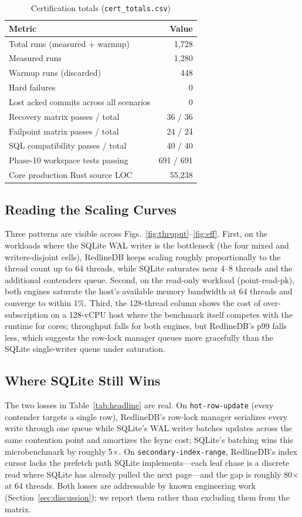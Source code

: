 \begin{table}[t]
\centering
\caption{Certification totals (\texttt{cert\_totals.csv})}
\label{tab:cert}
\renewcommand{\arraystretch}{1.05}
\begin{tabular}{@{}lr@{}}
\toprule
\textbf{Metric} & \textbf{Value} \\
\midrule
Total runs (measured + warmup) & 1{,}728 \\
Measured runs & 1{,}280 \\
Warmup runs (discarded) & 448 \\
Hard failures & 0 \\
Lost acked commits across all scenarios & 0 \\
Recovery matrix passes / total & 36 / 36 \\
Failpoint matrix passes / total & 24 / 24 \\
SQL compatibility passes / total & 40 / 40 \\
Phase-10 workspace tests passing & 691 / 691 \\
Core production Rust source LOC & 55{,}238 \\
\bottomrule
\end{tabular}
\end{table}

\subsection{Reading the Scaling Curves}
Three patterns are visible across Figs.~\ref{fig:thruput}--\ref{fig:eff}.
First, on the workloads where the SQLite WAL writer is the
bottleneck (the four mixed and writers-disjoint cells), RedlineDB
keeps scaling roughly proportionally to the thread count up to 64
threads, while SQLite saturates near 4--8 threads and the additional
contenders queue. Second, on the read-only workload (point-read-pk),
both engines saturate the host's available memory bandwidth at 64
threads and converge to within 1\%. Third, the 128-thread column
shows the cost of over-subscription on a 128-vCPU host where the
benchmark itself competes with the runtime for cores; throughput
falls for both engines, but RedlineDB's p99 falls less, which
suggests the row-lock manager queues more gracefully than the
SQLite single-writer queue under saturation.

\subsection{Where SQLite Still Wins}
The two losses in Table~\ref{tab:headline} are real. On
\texttt{hot-row-update} (every contender targets a single row),
RedlineDB's row-lock manager serializes every write through one
queue while SQLite's WAL writer batches updates across the same
contention point and amortizes the fsync cost; SQLite's batching wins
this microbenchmark by roughly 5$\times$.
On \texttt{secondary-index-range}, RedlineDB's index cursor lacks
the prefetch path SQLite implements---each leaf chase is a discrete
read where SQLite has already pulled the next page---and the gap is
roughly 80$\times$ at 64 threads. Both losses are addressable by
known engineering work (Section~\ref{sec:discussion}); we report
them rather than excluding them from the matrix.
